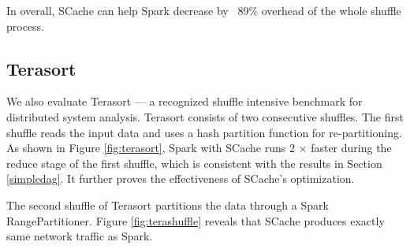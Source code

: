 In overall, SCache can help Spark decrease by ~$89\%$ overhead of the whole shuffle process. 

\subsection{Terasort}
We also evaluate Terasort \cite{spark-tera} --- a recognized shuffle intensive benchmark for distributed system analysis.
Terasort consists of two consecutive shuffles. 
The first shuffle reads the input data and uses a hash partition function for re-partitioning. 
As shown in Figure \ref{fig:terasort}, Spark with SCache runs 2 $\times$ faster during the reduce stage of the first shuffle, which is consistent with the results in Section \ref{simpledag}. 
It further proves the effectiveness of SCache's optimization.

The second shuffle of Terasort partitions the data through a Spark RangePartitioner. 
Figure \ref{fig:terashuffle} reveals that SCache produces exactly same network traffic as Spark. 

